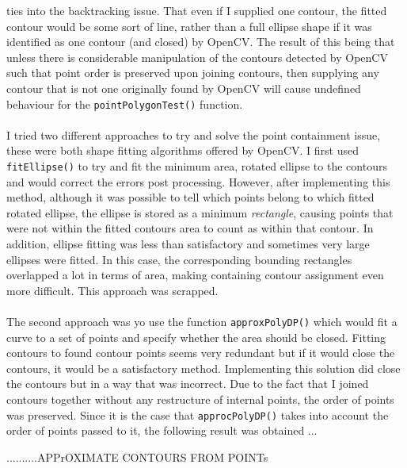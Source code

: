 \documentclass[11pt]{article}
\begin{document}
ties into the backtracking issue. That even if I supplied one contour, the
fitted contour would be some sort of line, rather than a full ellipse
shape if it was identified as one contour (and closed) by OpenCV. The result
of this being that unless there is considerable manipulation of the contours
detected by OpenCV such that point order is preserved upon joining contours,
then supplying any contour that is not one originally found by OpenCV will
cause undefined behaviour for the \texttt{pointPolygonTest()} function.\\
\\
I tried two different approaches to try and solve the point containment issue,
these were both shape fitting algorithms offered by OpenCV. I first used
\texttt{fitEllipse()} to try and fit the minimum area, rotated ellipse to
the contours and would correct the errors post processing. However, after
implementing this method, although it was possible to tell which points belong
to which fitted rotated ellipse, the ellipse is stored as a minimum 
\textit{rectangle}, causing points that were not within the fitted contours
area to count as within that contour. In addition, ellipse fitting was less
than satisfactory and sometimes very large ellipses were fitted. In this case,
the corresponding bounding rectangles overlapped a lot in terms of area, making
containing contour assignment even more difficult. This approach was scrapped.\\
\\
The second approach was yo use the function \texttt{approxPolyDP()} which 
would fit a curve to a set of points and specify whether the area should be
closed. Fitting contours to found contour points seems very redundant but if
it would close the contours, it would be a satisfactory method. Implementing
this solution did close the contours but in a way that was incorrect. 
Due to the fact that I joined contours together without any restructure
of internal points, the order of points was preserved. Since it is the case
that \texttt{approcPolyDP()} takes into account the order of points passed
to it, the following result was obtained ...

..........APPrOXIMATE CONTOURS FROM POINTs
\end{document}
